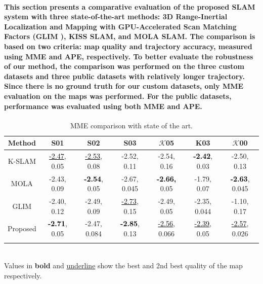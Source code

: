 \paragraph{\textnormal{This section presents a comparative evaluation of the proposed SLAM system with three state-of-the-art methods: 3D Range-Inertial Localization and Mapping with GPU-Accelerated Scan Matching Factors (GLIM \cite{koide2024glim}), KISS SLAM\cite{guadagnino2025kiss}, and MOLA SLAM\cite{blanco2025mola_lo}. The comparison is based on two criteria: map quality and trajectory accuracy, measured using MME and APE, respectively. To better evaluate the robustness of our method, the comparison was performed on the three custom datasets and three public datasets with relatively longer trajectory. Since there is no ground truth for our custom datasets, only MME evaluation on the maps was performed. For the public datasets, performance was evaluated using both MME and APE.}}
\begin{table}[ht]
	\centering
	\small
	\caption{MME comparison with state of the art.}
	\begin{tabular}{c|c|c|c|c|c|c}
		\Xhline{1.5pt}
		Method & S01 & S02 & S03&  $\mathcal{K}$05 & K03 & $\mathcal{K}$00\\
		\midrule
		K-SLAM  &\textcolor{black}{\underline{-2.47}}, 0.05  & \textcolor{black}{\underline{-2.53}}, 0.08 	& -2.52, 0.11  &  -2.54, 0.16	&\textcolor{black}{\textbf{-2.42}}, 0.03 & -2.50, 0.13\\
		
		MOLA  & -2.43, 0.09 &	\textcolor{black}{\textbf{-2.54}}, 0.05	& -2.67, 0.045	& \textcolor{black}{\textbf{-2.66,}} 0.05 	& -1.79, 0.07 &\textcolor{black}{\textbf{-2.63}}, 0.045 \\
		
		GLIM  	   & -2.40, 0.12 &	-2.49, 0.09	& \textcolor{black}{\underline{-2.73}}, 0.15 	& -2.49, 0.05	&-2.35, 0.044	 &-1.10, 0.17\\
		
		Proposed & \textcolor{black}{\textbf{-2.71}}, 0.05 &-2.47, 0.084 & \textcolor{black}{\textbf{-2.85}}, 0.13 &\textcolor{black}{\underline{-2.56}}, 0.066&\textcolor{black}{\underline{-2.39}}, 0.05  &\textcolor{black}{\underline{-2.57}}, 0.026 \\
		
		\Xhline{1.5pt} 
	\end{tabular}
	\vspace{0.1em}
	\\ Values in \textbf{bold} and \underline{underline} show the best and 2nd best quality of the map respectively. 
	\label{tab:sota_mme}
\end{table}

